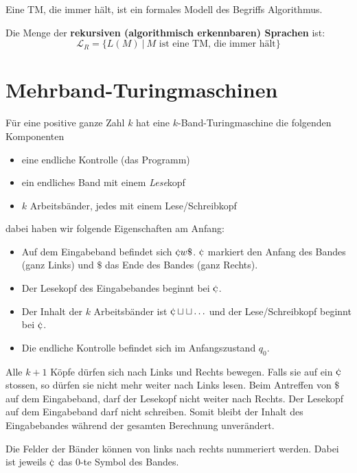 \begin{definition}
Eine TM, die immer hält, ist ein formales Modell des Begriffs Algorithmus.\\
\end{definition}


\begin{definition}
Die Menge der \textbf{rekursiven (algorithmisch erkennbaren) Sprachen} ist:
\[
\mathcal{L}_R = \{L(M) \ |\ M \text{ ist eine TM, die immer hält}\}
\]
\end{definition}

\section{Mehrband-Turingmaschinen}
Für eine positive ganze Zahl \(k\) hat eine \(k\)-Band-Turingmaschine die folgenden Komponenten
\begin{itemize}
  \item eine endliche Kontrolle (das Programm)
  \item ein endliches Band mit einem \textit{Lese}kopf
  \item \(k\) Arbeitsbänder, jedes mit einem Lese/Schreibkopf
\end{itemize}

dabei haben wir folgende Eigenschaften am Anfang:
\begin{itemize}
  \item Auf dem Eingabeband befindet sich \(\stopsym w \$\). \(\stopsym\) markiert den Anfang des Bandes (ganz Links) und \(\$\) das Ende des Bandes (ganz Rechts).
  \item Der Lesekopf des Eingabebandes beginnt bei \(\stopsym\).
  \item Der Inhalt der \(k\) Arbeitsbänder ist \(\stopsym \emptysym \emptysym \ldots\) und der Lese/Schreibkopf beginnt bei \(\stopsym\).
  \item Die endliche Kontrolle befindet sich im Anfangszustand \(q_0\).
\end{itemize}

Alle \(k + 1\) Köpfe dürfen sich nach Links und Rechts bewegen. Falls sie auf ein \(\stopsym\) stossen, so dürfen sie nicht mehr weiter nach Links lesen. Beim Antreffen von \(\$\) auf dem Eingabeband, darf der Lesekopf nicht weiter nach Rechts. Der Lesekopf auf dem Eingabeband darf nicht schreiben. Somit bleibt der Inhalt des Eingabebandes während der gesamten Berechnung unverändert.

Die Felder der Bänder können von links nach rechts nummeriert werden. Dabei ist jeweils \(\stopsym\) das 0-te Symbol des Bandes.

